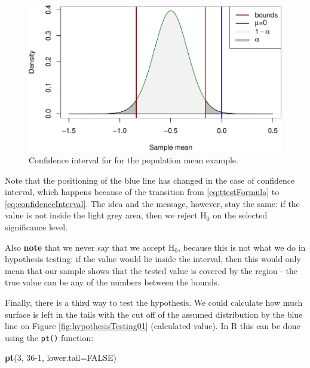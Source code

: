 \documentclass[
]{book}
\newenvironment{Shaded}{\begin{snugshade}}{\end{snugshade}}
\newcommand{\AttributeTok}[1]{\textcolor[rgb]{0.13,0.29,0.53}{#1}}
\newcommand{\ConstantTok}[1]{\textcolor[rgb]{0.56,0.35,0.01}{#1}}
\newcommand{\DecValTok}[1]{\textcolor[rgb]{0.00,0.00,0.81}{#1}}
\newcommand{\FunctionTok}[1]{\textcolor[rgb]{0.13,0.29,0.53}{\textbf{#1}}}
\newcommand{\NormalTok}[1]{#1}
\theoremstyle{definition}
\theoremstyle{definition}
\theoremstyle{definition}
\theoremstyle{definition}
\theoremstyle{remark}
\begin{document}
\begin{figure}
\centering
\includegraphics{Svetunkov---Statistics-for-Business-Analytics_files/figure-latex/hypothesisTesting02-1.pdf}
\caption{\label{fig:hypothesisTesting02}Confidence interval for for the population mean example.}
\end{figure}

Note that the positioning of the blue line has changed in the case of confidence interval, which happens because of the transition from \eqref{eq:ttestFormula} to \eqref{eq:confidenceInterval}. The idea and the message, however, stay the same: if the value is not inside the light grey area, then we reject \(\mathrm{H}_0\) on the selected significance level.

Also \textbf{note} that we never say that we accept \(\mathrm{H}_0\), because this is not what we do in hypothesis testing: if the value would lie inside the interval, then this would only mean that our sample shows that the tested value is covered by the region - the true value can be any of the numbers between the bounds.

Finally, there is a third way to test the hypothesis. We could calculate how much surface is left in the tails with the cut off of the assumed distribution by the blue line on Figure \ref{fig:hypothesisTesting01} (calculated value). In R this can be done using the \texttt{pt()} function:

\begin{Shaded}
\begin{Highlighting}[]
\FunctionTok{pt}\NormalTok{(}\DecValTok{3}\NormalTok{, }\DecValTok{36{-}1}\NormalTok{, }\AttributeTok{lower.tail=}\ConstantTok{FALSE}\NormalTok{)}
\end{Highlighting}
\end{Shaded}
\end{document}
